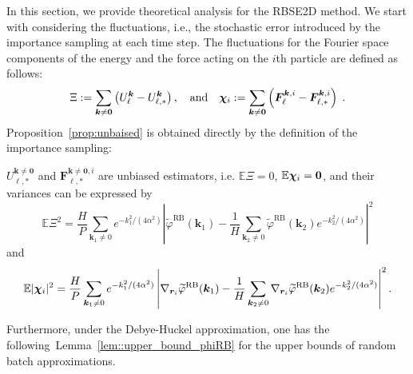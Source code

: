 In this section, we provide theoretical analysis for the RBSE2D method. We start with considering the fluctuations, i.e., the stochastic error introduced by the importance sampling at each time step.
The fluctuations for the Fourier space components of the energy and the force acting on the $i$th particle are defined as follows:
\begin{equation}\label{eq::xichi}
	\Xi := \sum_{\bm{k}\neq\bm{0}}\left( U_{\ell}^{\bm{k}}-U_{\ell,*}^{\bm{k}}\right),\quad\text{and}\quad\boldsymbol{\chi}_{i} :=\sum_{\bm{k}\neq\bm{0}}\left(\bm{F}_{\ell}^{\bm{k},i}-\bm{F}_{\ell,*}^{\bm{k},i}\right)\;.
\end{equation}
Proposition~\ref{prop:unbaised} is obtained directly by the definition of the importance sampling:
\begin{prop}\label{prop:unbaised}
	$U_{\ell,*}^{\bm{k}\neq\bm{0}}$ and $\bm{F}_{\ell,*}^{\bm{k}\neq\bm{0},i}$ are unbiased estimators, i.e. $\mathbb{E}\Xi= 0$, $\mathbb{E} \boldsymbol{\chi}_{i} = \bm 0$, and their variances can be expressed by
	\begin{equation}\label{eq::Exi}
		\mathbb{E}\Xi^2=\frac{H}{P}\sum_{\bm{k}_1\neq 0}e^{-k_1^2/(4\alpha^2)}\left|\widetilde{\varphi}^{\text{RB}}(\bm{k}_1)-\frac{1}{H} \sum_{\bm{k}_2\neq 0}\widetilde{\varphi}^{\text{RB}}(\bm{k}_2)e^{-k_2^2/(4\alpha^2)}\right|^2
	\end{equation}
	and
	\begin{equation}\label{eq::Echi}
		\mathbb{E}|\boldsymbol{\chi}_{i}|^2=\frac{H}{P}\sum_{\bm{k}_1\neq 0}e^{-k_1^2/(4\alpha^2)}\left|\nabla_{\bm{r}_i}\widetilde{\varphi}^{\text{RB}}(\bm{k}_1)-\frac{1}{H} \sum_{\bm{k}_2\neq 0}\nabla_{\bm{r}_i}\widetilde{\varphi}^{\text{RB}}(\bm{k}_2)e^{-k_2^2/(4\alpha^2)}\right|^2.
	\end{equation}
\end{prop}

Furthermore, under the Debye-H$\ddot{\text{u}}$ckel approximation, one has the following~Lemma~\ref{lem::upper_bound_phiRB} for the upper bounds of random batch approximations.

